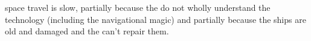 \Bane{} space travel is slow, partially because the \banes{} do not wholly understand the technology (including the navigational magic) and partially because the ships are old and damaged and the \banes{} can't repair them. 















% 
% 
% 
% 
% 
% 
% 
% 
% 
% 
% 
% 
% 
% 
% 
% 
% 
% 
% 
% 
